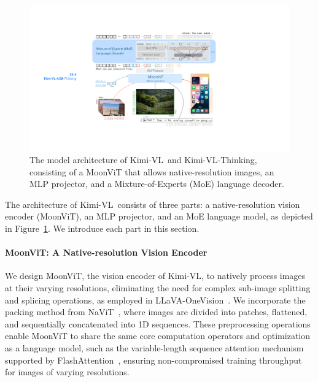 \documentclass{article}
\newcommand{\ourname}{{Kimi-VL}}
\newcommand{\ourreasoningname}{{\ourname-Thinking}}
\newcommand{\ychen}[2]{\textcolor{#1}{ychen:#2}}
\newcommand{\citep}[1]{\parencite{#1}}
\begin{document}
\begin{figure}
    \centering
    \includegraphics[width=0.9\linewidth]{figures/main-small.pdf}
    \vspace{-0.5em}
    \caption{The model architecture of \ourname~and \ourreasoningname, consisting of a MoonViT that allows native-resolution images, an MLP projector, and a Mixture-of-Experts (MoE) language decoder.}
    \label{fig:arch}
\end{figure}

The architecture of \ourname~consists of three parts: a native-resolution vision encoder (MoonViT), an MLP projector, and an MoE language
model, as depicted in Figure~\ref{fig:arch}. We introduce each part in this section.

\paragraph{MoonViT: A Native-resolution Vision Encoder} %
We design MoonViT, the vision encoder of \ourname, to natively process images at their varying resolutions, eliminating the need for complex sub-image splitting and splicing operations, as employed in LLaVA-OneVision~\citep{li2024llavaonevisioneasyvisualtask}. We incorporate the packing method from NaViT~\citep{dehghani2023patchnpacknavit}, where images are divided into patches, flattened, and sequentially concatenated into 1D sequences. These preprocessing operations enable MoonViT to share the same core computation operators and optimization as a language model, such as the variable-length sequence attention mechanism supported by FlashAttention~\citep{dao2022flashattentionfastmemoryefficientexact}, ensuring non-compromised training throughput for images of varying resolutions.
\end{document}
